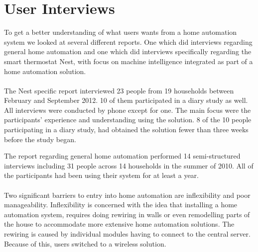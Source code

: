 \section{User Interviews}
\label{sec:interviewReports}
To get a better understanding of what users wants from a home automation system we looked at several different reports. One which did interviews regarding general home automation\cite{HAInterviews} and one which did interviews specifically regarding the smart thermostat Nest, with focus on machine intelligence integrated as part of a home automation solution\cite{AdaptiveInterviews}.
\\\\
The Nest specific report interviewed 23 people from 19 households between February and September 2012. 10 of them participated in a diary study as well. All interviews were conducted by phone except for one. The main focus were the participants' experience and understanding using the solution. 8 of the 10 people participating in a diary study, had obtained the solution fewer than three weeks before the study began\cite{AdaptiveInterviews}.

The report regarding general home automation performed 14 semi-structured interviews including 31 people across 14 households in the summer of 2010. All of the participants had been using their system for at least a year\cite{HAInterviews}.
\\\\
Two significant barriers to entry into home automation are inflexibility and poor manageability\cite{HAInterviews}. Inflexibility is concerned with the idea that installing a home automation system, requires doing rewiring in walls or even remodelling parts of the house to accommodate more extensive home automation solutions. The rewiring is caused by individual modules having to connect to the central server. Because of this, users switched to a wireless solution\cite{HAInterviews}.

